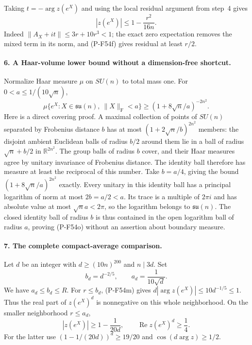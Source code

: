 Taking $t=-\arg z(e^X)$ and using the local residual argument
from step~4 gives
\[
                         |z(e^X)|\le1-\frac{r^2}{16n}.
                                                               \tag{P-F54n}
\]
Indeed $\|A_X+it\|\le3r+10r^3<1$; the exact zero
expectation removes the mixed term in its norm, and
(P-F54f) gives residual at least $r/2$.

\paragraph{6. A Haar-volume lower bound without a dimension-free shortcut.}
Normalize Haar measure $\mu$ on $SU(n)$ to total mass one.
For $0<a\le1/(10\sqrt n)$,
\[
 \mu\{e^X:X\in\mathfrak{su}(n),\ \|X\|_{\mathrm F}<a\}
                   \ge(1+8\sqrt n/a)^{-2n^2}.                \tag{P-F54o}
\]
Here is a direct covering proof. A maximal collection of
points of $SU(n)$ separated by Frobenius distance $b$ has
at most $(1+2\sqrt n/b)^{2n^2}$ members: the disjoint
ambient Euclidean balls of radius $b/2$ around them lie
in a ball of radius $\sqrt n+b/2$ in
$\mathbb R^{2n^2}$. The group balls of radius $b$ cover,
and their Haar measures agree by unitary invariance of
Frobenius distance. The identity ball therefore has
measure at least the reciprocal of this number.
Take $b=a/4$, giving the bound
$(1+8\sqrt n/a)^{2n^2}$ exactly.
Every unitary in this identity ball has a principal logarithm
of norm at most $2b=a/2<a$. Its trace is a multiple of $2\pi i$
and has absolute value at most $\sqrt n a<2\pi$, so the
logarithm belongs to $\mathfrak{su}(n)$.
The closed identity ball of radius $b$ is thus contained
in the open logarithm ball of radius $a$, proving (P-F54o)
without an assertion about boundary measure.

\paragraph{7. The complete compact-average comparison.}
Let $d$ be an integer with $d\ge(10n)^{200}$ and $n\mid3d$.
Set
\[
             b_d=d^{-2/5},\qquad a_d=\frac1{10\sqrt d}.
\]
We have $a_d\le b_d\le R$.
For $r\le b_d$, (P-F54m) gives
$d|\arg z(e^X)|\le10d^{-1/5}\le1$.
Thus the real part of $z(e^X)^d$ is nonnegative on this
whole neighborhood. On the smaller neighborhood $r\le a_d$,
\[
 |z(e^X)|\ge1-\frac1{20d},
 \qquad \operatorname{Re}z(e^X)^d\ge\frac14.                \tag{P-F54p}
\]
For the latter use $(1-1/(20d))^d\ge19/20$ and
$\cos(d\arg z)\ge1/2$.

